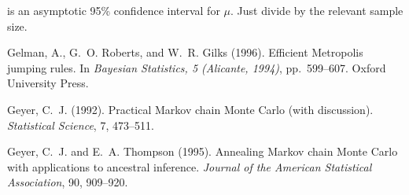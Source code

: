 \documentclass{article}
\begin{document}
is an asymptotic 95\% confidence interval for $\mu$.  Just divide by
the relevant sample size.

\begin{thebibliography}{}

Gelman, A., G.~O. Roberts, and W.~R. Gilks (1996).
\newblock Efficient Metropolis jumping rules.
\newblock In \emph{Bayesian Statistics, 5 (Alicante, 1994)}, pp.~599--607.
  Oxford University Press.

Geyer, C.~J. (1992).
\newblock Practical Markov chain Monte Carlo (with discussion).
\newblock \emph{Statistical Science}, 7, 473--511.

Geyer, C.~J. and E.~A. Thompson (1995).
\newblock Annealing Markov chain Monte Carlo with applications to
    ancestral inference.
\newblock \emph{Journal of the American Statistical Association}, 90, 909--920.

\end{thebibliography}
\end{document}
